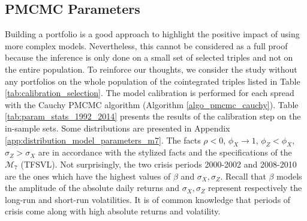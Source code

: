 \documentclass[11pt,a4,twosided,singlespacing,titlepagenumber=on]{scrreprt}
\numberwithin{equation}{chapter} %
\theoremstyle{remark}
\begin{document}
\subsection{PMCMC Parameters}
Building a portfolio is a good approach to highlight the positive impact of using more complex models. Nevertheless, this cannot be considered as a full proof because the inference is only done on a small set of selected triples and not on the entire population. To reinforce our thoughts, we consider the study without any portfolios on the whole population of the cointegrated triples listed in Table \ref{tab:calibration_selection}. The model calibration is performed for each spread with the Cauchy PMCMC algorithm (Algorithm \ref{algo_pmcmc_cauchy}). Table \ref{tab:param_stats_1992_2014} presents the results of the calibration step on the in-sample sets. Some distributions are presented in Appendix \ref{app:distribution_model_parameters_m7}. The facts $\rho < 0$, $\phi_X \rightarrow 1$, $\phi_Z<\phi_X$, $\sigma_Z > \sigma_X$ are in accordance with the stylized facts and the specifications of the $\mathcal{M}_7$ (TFSVL). Not surprisingly, the two crisis periods 2000-2002 and 2008-2010 are the ones which have the highest values of $\beta$ and $\sigma_X, \sigma_Z$. Recall that $\beta$ models the amplitude of the absolute daily returns and $\sigma_X, \sigma_Z$ represent respectively the long-run and short-run volatilities. It is of common knowledge that periods of crisis come along with high absolute returns and volatility.
\end{document}
